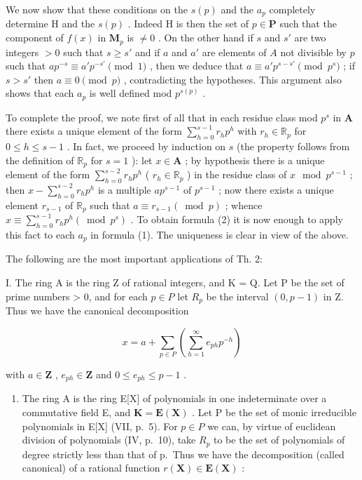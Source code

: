 We now show that these conditions on the \(s(p)\) and the \(a_{p}\) completely determine H and the \(s(p)\) . Indeed H is then the set of \(p \in \mathbf{P}\) such that the component of \(f(x)\) in \(\mathbf{M}_{p}\) is \(\neq 0\) . On the other hand if \(s\) and \(s'\) are two integers \(>0\) such that \(s \geqslant s'\) and if \(a\) and \(a'\) are elements of \(A\) not divisible by \(p\) such that \(ap^{-s} \equiv a'p^{-s'} \pmod{1}\) , then we deduce that \(a \equiv a'p^{s - s'} \pmod{p^s}\) ; if \(s > s'\) then \(a \equiv 0 \pmod{p}\) , contradicting the hypotheses. This argument also shows that each \(a_p\) is well defined mod \(p^{s(p)}\) .

To complete the proof, we note first of all that in each residue class mod \(p^s\) in \(\mathbf{A}\) there exists a unique element of the form \(\sum_{h=0}^{s-1} r_h p^h\) with \(r_h \in \mathbb{R}_p\) for \(0 \leqslant h \leqslant s-1\) . In fact, we proceed by induction on \(s\) (the property follows from the definition of \(\mathbb{R}_p\) for \(s=1\) ): let \(x \in \mathbf{A}\) ; by hypothesis there is a unique element of the form \(\sum_{h=0}^{s-2} r_h p^h\) ( \(r_h \in \mathbb{R}_p\) ) in the residue class of \(x \mod p^{s-1}\) ; then \(x - \sum_{h=0}^{s-2} r_h p^h\) is a multiple \(ap^{s-1}\) of \(p^{s-1}\) ; now there exists a unique element \(r_{s-1}\) of \(\mathbb{R}_p\) such that \(a \equiv r_{s-1} (\bmod p)\) ; whence \(x \equiv \sum_{h=0}^{s-1} r_h p^h (\bmod p^s)\) . To obtain formula (2) it is now enough to apply this fact to each \(a_p\) in formula (1). The uniqueness is clear in view of the above.

The following are the most important applications of Th. 2:

I. The ring A is the ring Z of rational integers, and K = Q. Let P be the set of prime numbers \textgreater{} 0, and for each \(p \in P\) let \(R_{p}\) be the interval \((0, p - 1)\) in Z. Thus we have the canonical decomposition

\[
x = a + \sum_ {p \in P} \left(\sum_ {h = 1} ^ {\infty} e _ {p h} p ^ {- h}\right)
\]

with \(a \in \mathbf{Z}\) , \(e_{ph} \in \mathbf{Z}\) and \(0 \leqslant e_{ph} \leqslant p - 1\) .

\begin{enumerate}
\def\labelenumi{\Roman{enumi}.}
\setcounter{enumi}{1}
\tightlist
\item
  The ring A is the ring E{[}X{]} of polynomials in one indeterminate over a commutative field E, and \(\mathbf{K} = \mathbf{E}(\mathbf{X})\) . Let P be the set of monic irreducible polynomials in E{[}X{]} (VII, p.~5). For \(p \in P\) we can, by virtue of euclidean division of polynomials (IV, p.~10), take \(R_{p}\) to be the set of polynomials of degree strictly less than that of p.~Thus we have the decomposition (called canonical) of a rational function \(r(\mathbf{X}) \in \mathbf{E}(\mathbf{X})\) :
\end{enumerate}

